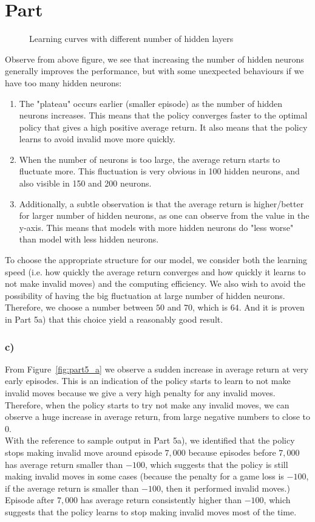 \documentclass{article}
\newcommand{\enterProblemHeader}[1]{
}
\newcommand{\exitProblemHeader}[1]{
}
\newcounter{homeworkProblemCounter} %
\newcommand{\homeworkProblemName}{}
\newenvironment{homeworkProblem}[1][Part \arabic{homeworkProblemCounter}]{ %
\stepcounter{homeworkProblemCounter} %
\renewcommand{\homeworkProblemName}{#1} %
\section{\homeworkProblemName} %
\enterProblemHeader{\homeworkProblemName} %
}{
\exitProblemHeader{\homeworkProblemName} %
}
\begin{document}
\begin{homeworkProblem}
\begin{figure}[!ht]
\caption{Learning curves with different number of hidden layers}
\label{fig:part5_b}
\end{figure}

Observe from above figure, we see that increasing the number of hidden neurons generally improves the performance, but with some unexpected behaviours if we have too many hidden neurons:
\begin{enumerate}
    \item The "plateau" occurs earlier (smaller episode) as the number of hidden neurons increases. This means that the policy converges faster to the optimal policy that gives a high positive average return. It also means that the policy learns to avoid invalid move more quickly.
    \item When the number of neurons is too large, the average return starts to fluctuate more. This fluctuation is very obvious in 100 hidden neurons, and also visible in 150 and 200 neurons.
    \item Additionally, a subtle observation is that the average return is higher/better for larger number of hidden neurons, as one can observe from the value in the y-axis. This means that models with more hidden neurons do "less worse" than model with less hidden neurons.
\end{enumerate}
To choose the appropriate structure for our model, we consider both the learning speed (i.e. how quickly the average return converges and how quickly it learns to not make invalid moves) and the computing efficiency. We also wish to avoid the possibility of having the big fluctuation at large number of hidden neurons. Therefore, we choose a number between $50$ and $70$, which is $64$. And it is proven in Part 5a) that this choice yield a reasonably good result. 


\subsubsection*{c)}
From Figure~\ref{fig:part5_a} we observe a sudden increase in average return at very early episodes. This is an indication of the policy starts to learn to not make invalid moves because we give a very high penalty for any invalid moves. Therefore, when the policy starts to try not make any invalid moves, we can observe a huge increase in average return, from large negative numbers to close to 0. 
\\
With the reference to sample output in Part 5a), we identified that the policy stops making invalid move around episode $7,000$ because episodes before $7,000$ has average return smaller than $-100$, which suggests that the policy is still making invalid moves in some cases (because the penalty for a game loss is $-100$, if the average return is smaller than $-100$, then it performed invalid moves.) Episode after $7,000$ has average return consistently higher than $-100$, which suggests that the policy learns to stop making invalid moves most of the time.



\end{homeworkProblem}
\end{document}
